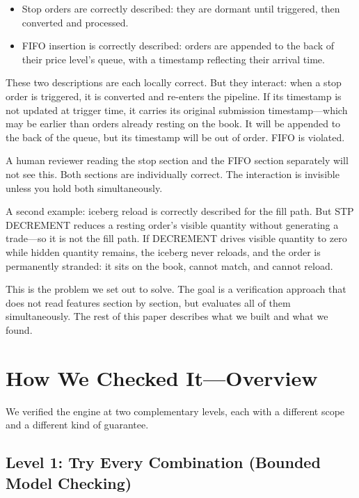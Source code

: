 \documentclass[11pt,a4paper]{article}
\begin{document}
\begin{itemize}[nosep]
\item Stop orders are correctly described: they are dormant until
      triggered, then converted and processed.
\item FIFO insertion is correctly described: orders are appended to the
      back of their price level's queue, with a timestamp reflecting
      their arrival time.
\end{itemize}

These two descriptions are each locally correct. But they interact:
when a stop order is triggered, it is converted and re-enters the
pipeline. If its timestamp is not updated at trigger time, it carries
its original submission timestamp---which may be earlier than orders
already resting on the book. It will be appended to the back of the
queue, but its timestamp will be out of order. FIFO is violated.

A human reviewer reading the stop section and the FIFO section
separately will not see this. Both sections are individually correct.
The interaction is invisible unless you hold both simultaneously.

A second example: iceberg reload is correctly described for the fill
path. But STP DECREMENT reduces a resting order's visible quantity
without generating a trade---so it is not the fill path. If DECREMENT
drives visible quantity to zero while hidden quantity remains, the
iceberg never reloads, and the order is permanently stranded: it sits
on the book, cannot match, and cannot reload.

This is the problem we set out to solve. The goal is a verification
approach that does not read features section by section, but evaluates
all of them simultaneously. The rest of this paper describes what we
built and what we found.


\section{How We Checked It---Overview}
\label{sec:overview}

We verified the engine at two complementary levels, each with a
different scope and a different kind of guarantee.

\subsection{Level 1: Try Every Combination (Bounded Model Checking)}
\label{sec:overview-tlc}
\end{document}

